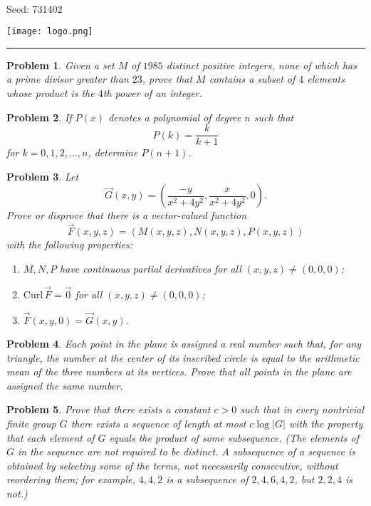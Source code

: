 \documentclass[12pt]{article}
\newtheorem{opg}{Problem}
\begin{document}
\parbox{0.6\textwidth}{ \\[2ex] {\Large Seed: 731402}}
\parbox{0.4\textwidth}{\texttt{[image: logo.png]}}

\hrule

\begin{opg}
Given a set $M$ of $1985$ distinct positive integers, none of which has a prime divisor greater than $23$, prove that $M$ contains a subset of $4$  elements whose product is the $4$th power of an integer.


\end{opg}
\begin{opg}
If $P(x)$ denotes a polynomial of degree $n$ such that \[P(k)=\frac{k}{k+1}\] for $k=0,1,2,\ldots,n$, determine $P(n+1)$.


\end{opg}
\begin{opg}
Let
\[
\vec{G}(x,y) = \left( \frac{-y}{x^2+4y^2}, \frac{x}{x^2+4y^2},0
\right).
\]
Prove or disprove that there is a vector-valued function
\[
\vec{F}(x,y,z) = (M(x,y,z), N(x,y,z), P(x,y,z))
\]
with the following properties:
\begin{enumerate}
\item[(i)] $M,N,P$ have continuous partial derivatives for all
$(x,y,z) \neq (0,0,0)$;
\item[(ii)] $\mathrm{Curl}\,\vec{F} = \vec{0}$ for all $(x,y,z) \neq (0,0,0)$;
\item[(iii)] $\vec{F}(x,y,0) = \vec{G}(x,y)$.
\end{enumerate}

\end{opg}
\begin{opg}
Each point in the plane is assigned a real number such that, for any triangle, the number at the center of its inscribed circle is equal to the arithmetic mean of the three numbers at its vertices. Prove that all points in the plane are assigned the same number.


\end{opg}
\begin{opg}
Prove that there exists a constant $c>0$ such that in every
nontrivial finite group $G$ there exists a sequence of length
at most $c \log |G|$ with the property that each element of $G$
equals the product of some subsequence. (The elements of $G$ in the
sequence are not required to be distinct. A \emph{subsequence}
of a sequence is obtained by selecting some of the terms,
not necessarily consecutive, without reordering them; for
example, $4, 4, 2$ is a subsequence of $2, 4, 6, 4, 2$, but
$2, 2, 4$ is not.)

\end{opg}
\end{document}
